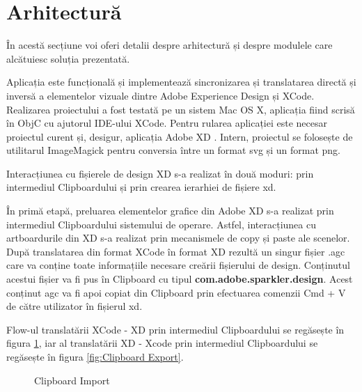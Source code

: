 \section{Arhitectură}

În acestă secțiune voi oferi detalii despre arhitectură și despre modulele care alcătuiesc soluția prezentată.

Aplicația este funcțională și implementează sincronizarea și translatarea directă și inversă a elementelor vizuale dintre Adobe Experience Design și XCode. 
Realizarea proiectului a fost testată pe un sistem Mac OS X, aplicația fiind scrisă în ObjC cu ajutorul IDE-ului XCode. Pentru rularea aplicației este necesar proiectul curent \cite{repoGit} și, desigur, aplicația Adobe XD \cite{xd}.
Intern, proiectul se folosește de utilitarul ImageMagick \cite{imageMagick} pentru conversia între un format svg și un format png.

Interacțiunea cu fișierele de design XD s-a realizat în două moduri: prin intermediul Clipboardului și prin crearea ierarhiei de fișiere xd.

În primă etapă, preluarea elementelor grafice din Adobe XD s-a realizat prin intermediul Clipboardului sistemului de operare. Astfel, interacțiunea cu artboardurile din XD s-a realizat prin mecanismele de copy și paste ale scenelor.
După translatarea din format XCode în format XD rezultă un singur fișier .agc care va conține toate informațiile necesare creării fișierului de design. Conținutul acestui fișier va fi pus în Clipboard cu tipul \textbf{com.adobe.sparkler.design}. Acest conținut agc va fi apoi copiat din Clipboard prin efectuarea comenzii Cmd + V de către utilizator în fișierul xd.

Flow-ul translatării XCode - XD prin intermediul Clipboardului se regăsește în figura \ref{fig:Clipboard Import}, iar al translatării XD - Xcode prin intermediul Clipboardului se regăsește în figura \ref{fig:Clipboard Export}.


\begin{figure}[!htbp]
\centering
{}
\caption{Clipboard Import} \label{fig:Clipboard Import}
\end{figure}

